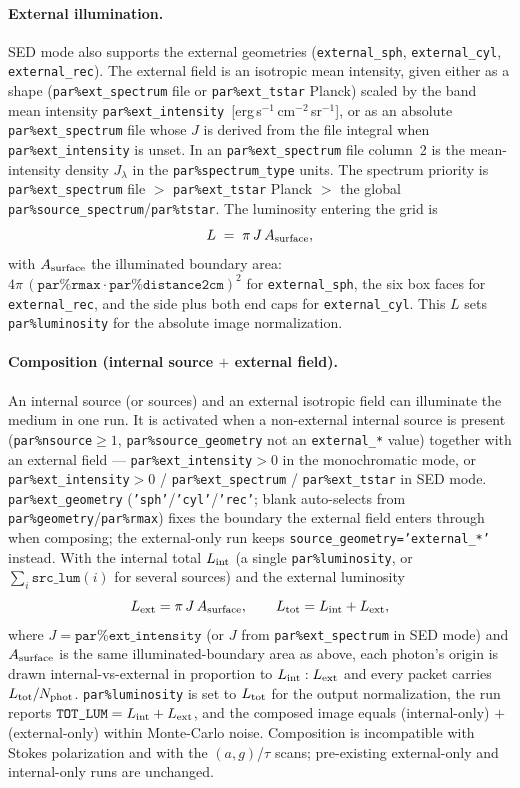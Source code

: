\documentclass[english,a4paper]{kiseon_memo}
\newcommand{\pp}[1]{\texttt{par\%#1}}
\newcommand{\code}[1]{\texttt{#1}}
\begin{document}
\paragraph{External illumination.}  SED mode also supports the external
geometries (\code{external\_sph}, \code{external\_cyl}, \code{external\_rec}).  The
external field is an isotropic mean intensity, given either as a shape
(\pp{ext\_spectrum} file or \pp{ext\_tstar} Planck) scaled by the band mean
intensity \pp{ext\_intensity}~[erg\,s$^{-1}$\,cm$^{-2}$\,sr$^{-1}$], or as an
absolute \pp{ext\_spectrum} file whose $J$ is derived from the file integral when
\pp{ext\_intensity} is unset.  In an \pp{ext\_spectrum} file column~2 is the
mean-intensity density $J_\lambda$ in the \pp{spectrum\_type} units.  The
spectrum priority is \pp{ext\_spectrum} file $>$ \pp{ext\_tstar} Planck $>$ the
global \pp{source\_spectrum}/\pp{tstar}.  The luminosity entering the grid is
\begin{equation}
  L \;=\; \pi\,J\,A_{\rm surface},
\end{equation}
with $A_{\rm surface}$ the illuminated boundary area:
$4\pi\,(\pp{rmax}\cdot\pp{distance2cm})^2$ for \code{external\_sph}, the six box
faces for \code{external\_rec}, and the side plus both end caps for
\code{external\_cyl}.  This $L$ sets \pp{luminosity} for the absolute image
normalization.

\paragraph{Composition (internal source $+$ external field).}
An internal source (or sources) and an external isotropic field can illuminate
the medium in one run.  It is activated when a non-external internal source is
present (\pp{nsource}${}\ge1$, \pp{source\_geometry} not an \code{external\_*}
value) together with an external field --- \pp{ext\_intensity}${}>0$ in the
monochromatic mode, or \pp{ext\_intensity}${}>0$ / \pp{ext\_spectrum} /
\pp{ext\_tstar} in SED mode.  \pp{ext\_geometry}
(\code{'sph'}/\code{'cyl'}/\code{'rec'}; blank auto-selects from
\pp{geometry}/\pp{rmax}) fixes the boundary the external field enters through
when composing; the external-only run keeps \code{source\_geometry='external\_*'}
instead.  With the internal total $L_{\rm int}$ (a single \pp{luminosity}, or
$\sum_i\code{src\_lum}(i)$ for several sources) and the external luminosity
\begin{equation}
  L_{\rm ext}=\pi\,J\,A_{\rm surface},\qquad
  L_{\rm tot}=L_{\rm int}+L_{\rm ext},
\end{equation}
where $J=\pp{ext\_intensity}$ (or $J$ from \pp{ext\_spectrum} in SED mode) and
$A_{\rm surface}$ is the same illuminated-boundary area as above, each photon's
origin is drawn internal-vs-external in proportion to $L_{\rm int}:L_{\rm ext}$
and every packet carries $L_{\rm tot}/N_{\rm phot}$.  \pp{luminosity} is set to
$L_{\rm tot}$ for the output normalization, the run reports
$\code{TOT\_LUM}=L_{\rm int}+L_{\rm ext}$, and the composed image equals
(internal-only) $+$ (external-only) within Monte-Carlo noise.  Composition is
incompatible with Stokes polarization and with the $(a,g)$/$\tau$ scans;
pre-existing external-only and internal-only runs are unchanged.
\end{document}
